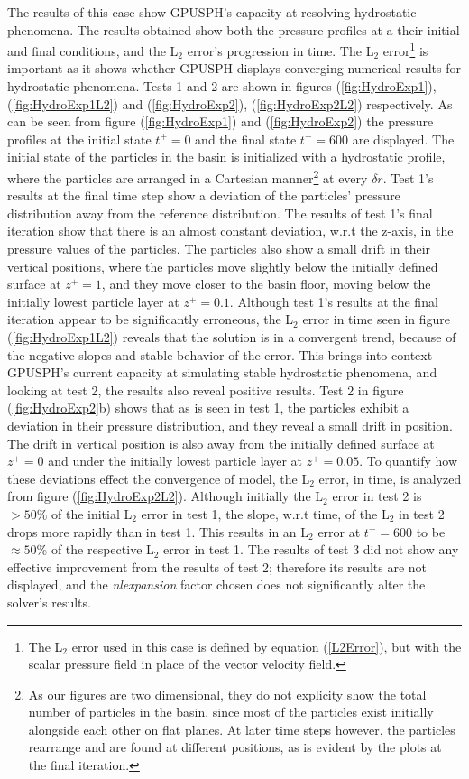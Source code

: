 \documentclass{../GPUSPHtemplate}
\begin{document}
The results of this case show GPUSPH's capacity at resolving hydrostatic phenomena. The results obtained show
both the pressure profiles at a their initial and final conditions, and the L$_2$ error's progression in time.
The L$_2$ error\footnote{The L$_2$ error used in this case is defined by equation (\ref{L2Error}), but with
  the scalar pressure field in place of the vector velocity field.} is important as it shows whether
GPUSPH displays converging numerical results for hydrostatic phenomena. Tests 1 and 2 are shown in
figures (\ref{fig:HydroExp1}), (\ref{fig:HydroExp1L2}) and (\ref{fig:HydroExp2}), (\ref{fig:HydroExp2L2})
respectively. As can be seen from figure (\ref{fig:HydroExp1}) and (\ref{fig:HydroExp2}) the pressure
profiles at the initial state $t^+=0$ and the final state $t^+=600$ are displayed. The initial state of
the particles in the basin is initialized with a hydrostatic profile, where the particles are arranged
in a Cartesian manner\footnote{As our figures are two dimensional, they do not explicity show the total
  number of particles in the basin, since most of the particles exist initially alongside each other on flat planes.
  At later time steps however, the particles rearrange and are found at different positions, as is evident
  by the plots at the final iteration.} at every $\delta r$. Test 1's results at the final time step show
a deviation of the particles' pressure distribution away from the reference distribution. The results of
test 1's final iteration show that there is an almost constant deviation, w.r.t the z-axis, in the
pressure values of the particles. The particles also show a small drift in their vertical positions,
where the particles move slightly below the initially defined surface at $z^+=1$, and they move closer
to the basin floor, moving below the initially lowest particle layer at $z^+ = 0.1$. Although test 1's
results at the final iteration appear to be significantly erroneous, the L$_2$ error in time seen in
figure (\ref{fig:HydroExp1L2}) reveals that the solution is in a convergent trend, because of the
negative slopes and stable behavior of the error. This brings into context GPUSPH's current capacity
at simulating stable hydrostatic phenomena, and looking at test 2, the results also reveal positive results.
Test 2 in figure (\ref{fig:HydroExp2}b) shows that as is seen in test 1, the particles exhibit a deviation
in their pressure distribution, and they reveal a small drift in position. The drift in vertical position
is also away from the initially defined surface at $z^+=0$ and under the initially lowest particle layer
at $z^+=0.05$. To quantify how these deviations effect the convergence of model, the L$_2$ error, in time,
is analyzed from figure (\ref{fig:HydroExp2L2}). Although initially the L$_2$ error in test 2 is $ >50\% $
of the initial L$_2$ error in test 1, the slope, w.r.t time, of the L$_2$ in test 2 drops more rapidly
than in test 1. This results in an L$_2$ error at $t^+=600$ to be $\approx 50\%$ of the respective L$_2$
error in test 1. The results of test 3 did not show any effective improvement from the results of test 2;
therefore its results are not displayed, and the \textit{nlexpansion} factor chosen does not significantly alter the solver's results.\\ 
\end{document}
